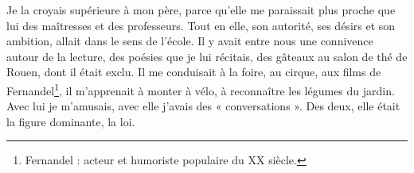 {Je la croyais supérieure à mon père, parce qu’elle me paraissait plus proche que lui des maîtresses et des professeurs. Tout en elle, son autorité, ses désirs et son ambition, allait dans le sens de l’école. Il y avait entre nous une connivence autour de la lecture, des poésies que je lui récitais, des gâteaux au salon de thé de Rouen, dont il était exclu. Il me conduisait à la foire, au cirque, aux films de Fernandel\footnote{Fernandel : acteur et humoriste populaire du XX\ieme{} siècle.}, il m’apprenait à monter à vélo, à reconnaître les légumes du jardin. Avec lui je m’amusais, avec elle j’avais des « conversations ». Des deux, elle était la figure dominante, la loi.
}


